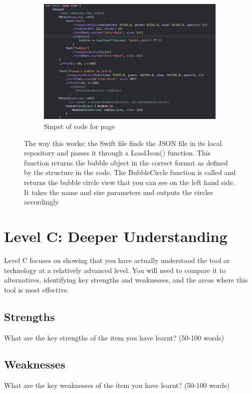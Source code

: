 \documentclass[a4paper, 11pt]{report}
\begin{document}
\begin{figure}
  \begin{subfigure}[h]{0.7\textwidth}
    \includegraphics[width=\textwidth]{viewbubble.png}
    \caption{Sinpet of code for page}
    \label{fig:image2}
  \end{subfigure}
  \caption{
The way this works: the Swift file finds the JSON file in its local repository and passes it through a LoadJson() function. This function returns the bubble object in the correct format as defined by the structure in the code.
The BubbleCircle function is called and returns the bubble circle view that you can see on the left hand side. It takes the name and size parameters and outputs the circles accordingly
}
  \label{fig:images}
\end{figure}

\newpage
\section{Level C: Deeper Understanding}

Level C focuses on showing that you have actually understood the tool or technology at a relatively advanced level. You will need to compare it to alternatives, identifying key strengths and weaknesses, and the areas where this tool is most effective. 

\subsection{Strengths}
What are the key strengths of the item you have learnt? (50-100 words)

\subsection{Weaknesses}
What are the key weaknesses of the item you have learnt? (50-100 words)
\end{document}
